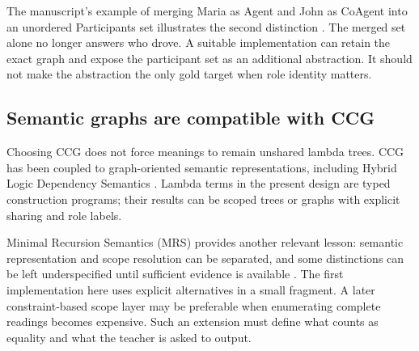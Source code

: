 \documentclass[11pt,a4paper]{article}
\begin{document}
The manuscript's example of merging Maria as Agent and John as CoAgent into
an unordered Participants set illustrates the second distinction
\cite[Sections 6.4--6.5]{senf}. The merged set alone no longer answers who
drove. A suitable implementation can retain the exact graph and expose the
participant set as an additional abstraction. It should not make the
abstraction the only gold target when role identity matters.

\subsection{Semantic graphs are compatible with CCG}
Choosing CCG does not force meanings to remain unshared lambda trees.
CCG has been coupled to graph-oriented semantic representations, including
Hybrid Logic Dependency Semantics \cite{baldridge}. Lambda terms in the
present design are typed construction programs; their results can be
scoped trees or graphs with explicit sharing and role labels.

Minimal Recursion Semantics (MRS) provides another relevant lesson:
semantic representation and scope resolution can be separated, and some
distinctions can be left underspecified until sufficient evidence is available
\cite{mrs}. The first implementation here uses explicit alternatives in a
small fragment. A later constraint-based scope layer may be preferable when
enumerating complete readings becomes expensive. Such an extension must
define what counts as equality and what the teacher is asked to output.
\end{document}
